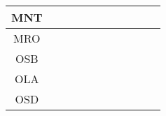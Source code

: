 \documentclass[a4paper,12pt]{article}
\begin{document}
\begin{tabular}{|c|c|c|c|c|c|c|c|c|c|c|}
        MNT&\cellcolor[HTML]{984EA3}&\cellcolor[HTML]{984EA3}&\cellcolor[HTML]{984EA3}&\cellcolor[HTML]{984EA3}&\cellcolor[HTML]{984EA3}\\ \hline %
        MRO&\cellcolor[HTML]{984EA3}&\cellcolor[HTML]{984EA3}&\cellcolor[HTML]{984EA3}&\cellcolor[HTML]{984EA3}&\cellcolor[HTML]{984EA3}\\ \hline %
        OSB&\cellcolor[HTML]{FF7F00}&\cellcolor[HTML]{FF7F00}&\cellcolor[HTML]{FF7F00}&\cellcolor[HTML]{FF7F00}&\cellcolor[HTML]{FF7F00}\\ \hline %
        OLA&\cellcolor[HTML]{FF7F00}&\cellcolor[HTML]{FFFF33}&\cellcolor[HTML]{FF7F00}&\cellcolor[HTML]{FFFF33}&\cellcolor[HTML]{FF7F00}\\ \hline %
        OSD&\cellcolor[HTML]{FF7F00}&\cellcolor[HTML]{FFFF33}&\cellcolor[HTML]{FFFF33}&\cellcolor[HTML]{A65628}&\cellcolor[HTML]{FFFF33}\\ \hline %
\end{tabular}
\end{document}
